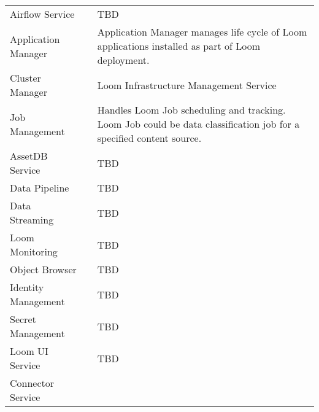 \documentclass[letterpaper,10pt,english]{sphinxmanual}
\begin{document}
\begin{savenotes}\sphinxattablestart
\centering
\begin{tabulary}{\linewidth}[t]{|T|T|T|}
\hline
{}\relax &\relax &\relax \\
\hline
Airflow Service
&
&
TBD
\\
\hline
Application Manager
&
&
Application Manager manages life cycle of Loom applications
installed as part of Loom deployment.
\\
\hline
Cluster Manager
&
&
Loom Infrastructure Management Service
\\
\hline
Job Management
&
&
Handles Loom Job scheduling and tracking. Loom Job could be
data classification job for a specified content source.
\\
\hline
AssetDB Service
&
&
TBD
\\
\hline
Data Pipeline
&
&
TBD
\\
\hline
Data Streaming
&
&
TBD
\\
\hline
Loom Monitoring
&
&
TBD
\\
\hline
Object Browser
&
&
TBD
\\
\hline
Identity Management
&
&
TBD
\\
\hline
Secret Management
&
&
TBD
\\
\hline
Loom UI Service
&
&
TBD
\\
\hline
Connector Service
&

\end{tabulary}
\end{savenotes}
\end{document}
